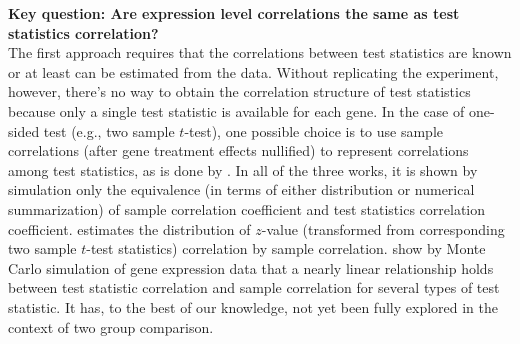 \documentclass[12pt, a4paper]{article}
\begin{document}
	\textbf{Key question: Are  expression level correlations the same as test statistics correlation?}\\
	The first approach requires that the correlations between test statistics are known or at least can be estimated from the data. Without 
	replicating the experiment, however, there's no way to obtain the correlation structure of test statistics because only a single test 
	statistic is available for each gene. In the case of one-sided test (e.g., two sample $t$-test), one possible choice is to use sample 
	correlations (after gene treatment effects nullified) to represent correlations among test statistics, as is done by 
	\citet{barry2008statistical, efron2007correlation, wu2012camera}. 
	In all of the three works, it is shown by simulation only the
	equivalence (in terms of either distribution or numerical summarization) of sample correlation coefficient and test statistics correlation coefficient. 
	\citet{efron2007correlation} estimates the distribution of $z$-value (transformed from corresponding two sample $t$-test statistics) 
	correlation by sample correlation. \citet{barry2008statistical} show by Monte Carlo simulation of gene expression data that a nearly linear 
	relationship holds between test statistic correlation and sample correlation for several types of test statistic.
	 It has, to the best of our knowledge, not yet been fully explored in
	the context of two group comparison.
	
\end{document}
